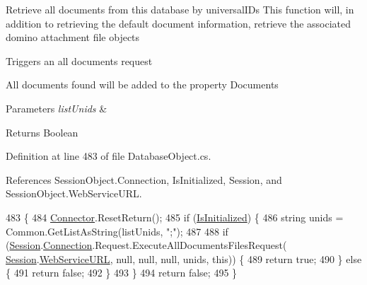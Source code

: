 Retrieve all documents from this database by universal\+I\+Ds This function will, in addition to retrieving the default document information, retrieve the associated domino attachment file objects 

Triggers an all documents request

All documents found will be added to the property \textquotesingle{}Documents\textquotesingle{}


\begin{DoxyParams}{Parameters}
{\em list\+Unids} & \\
\hline
\end{DoxyParams}
\begin{DoxyReturn}{Returns}
Boolean
\end{DoxyReturn}


Definition at line 483 of file Database\+Object.\+cs.



References Session\+Object.\+Connection, Is\+Initialized, Session, and Session\+Object.\+Web\+Service\+U\+RL.


\begin{DoxyCode}
483                                                                 \{
484         \mbox{\hyperlink{class_connector}{Connector}}.ResetReturn();
485         \textcolor{keywordflow}{if} (\mbox{\hyperlink{class_database_object_a5fe036d32a30eb10d1b3f6a30263f740}{IsInitialized}}) \{
486             \textcolor{keywordtype}{string} unids = Common.GetListAsString(listUnids, \textcolor{stringliteral}{";"});
487 
488             \textcolor{keywordflow}{if} (\mbox{\hyperlink{class_database_object_aa8484162b7d2a7c4c9426bca13c64c07}{Session}}.\mbox{\hyperlink{class_session_object_a014bdbf705a753540e19bfb53030c55c}{Connection}}.Request.ExecuteAllDocumentsFilesRequest(
      \mbox{\hyperlink{class_database_object_aa8484162b7d2a7c4c9426bca13c64c07}{Session}}.\mbox{\hyperlink{class_session_object_a697c071c812fbf7ad1166b896fb44c16}{WebServiceURL}}, null, null, null, unids, \textcolor{keyword}{this})) \{
489                 \textcolor{keywordflow}{return} \textcolor{keyword}{true};
490             \} \textcolor{keywordflow}{else} \{
491                 \textcolor{keywordflow}{return} \textcolor{keyword}{false};
492             \}
493         \}
494         \textcolor{keywordflow}{return} \textcolor{keyword}{false};
495     \}
\end{DoxyCode}
\mbox{\label{class_database_object_a6bfb480373a7e2bdbeaa67e4e3303a3a}} 
